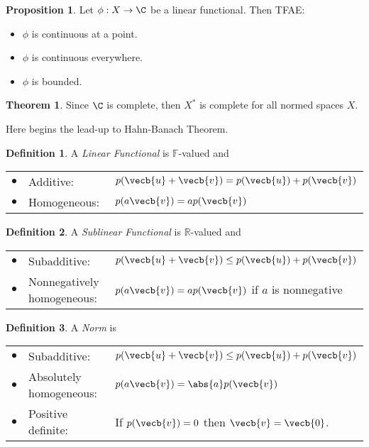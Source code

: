 \documentclass[a5paper]{article}
\theoremstyle{definition}%
\newtheorem*{theorem*}{Theorem} %
\newtheorem*{proposition*}{Proposition}
\newtheorem*{definition*}{Definition}
\numberwithin{exercise}{section}
\theoremstyle{remark}%
\begin{document}
\begin{proposition*}
Let $\phi:X\to\C$ be a linear functional. Then TFAE:
	\begin{itemize}
	\item $\phi$ is continuous at a point.
	\item $\phi$ is continuous everywhere.
	\item $\phi$ is bounded.
	\end{itemize}
\end{proposition*}

\begin{theorem*}
Since $\C$ is complete, then $X^*$ is complete for all normed spaces $X$.
\end{theorem*}

\begin{highlight}
Here begins the lead-up to Hahn-Banach Theorem.
\end{highlight}

\let\oldvec\vec 
\renewcommand{\vec}{\vecb}

\begin{definition*}
A \emph{Linear Functional} is $\mathbb{F}$-valued and

	\begin{tabular}{lll}
	$\bullet$ &Additive: $\quad\quad\quad\quad\quad\quad$& $p(\vec{u}+\vec{v})= p(\vec{u})+p(\vec{v})$ \\
	$\bullet$ &Homogeneous: &$p(a\vec{v})=ap(\vec{v})$ \\
	\end{tabular}
	
\end{definition*}

\begin{definition*}
A \emph{Sublinear Functional} is $\mathbb{R}$-valued and

	\begin{tabular}{lll}
	$\bullet$ &Subadditive: $\quad\quad\quad\quad\quad	$& $p(\vec{u}+\vec{v})\leq p(\vec{u})+p(\vec{v})$ \\
	$\bullet$ &Nonnegatively homogeneous: &$p(a\vec{v})=ap(\vec{v})$ if $a$ is nonnegative \\
	\end{tabular}
	
\end{definition*}

\begin{definition*}
A \emph{Norm }is

	\begin{tabular}{lll}
	$\bullet$ &Subadditive: & $p(\vec{u}+\vec{v})\leq p(\vec{u})+p(\vec{v})$ \\
	$\bullet$ &Absolutely homogeneous: &$p(a\vec{v})=\abs{a}p(\vec{v})$ \\
	$\bullet$ &Positive definite: &If $p(\vec{v})=0$ then $\vec{v}=\vec{0}$. 		
	\end{tabular}
\end{definition*}
\end{document}
